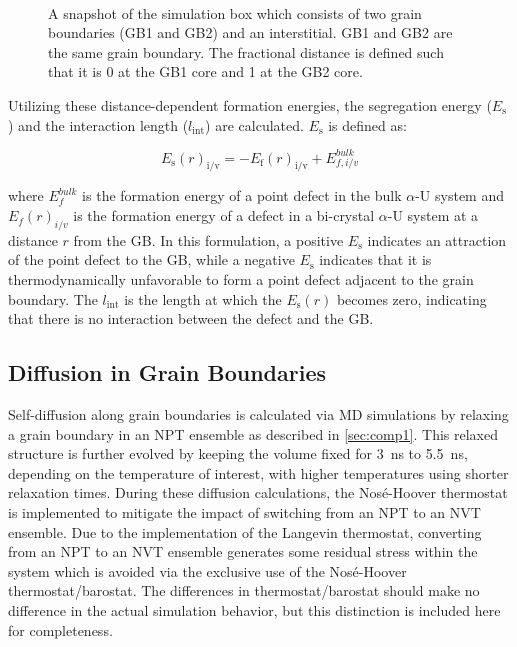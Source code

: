 \documentclass[review]{elsarticle}
\begin{document}
\begin{figure}[h!]
\centering
{}\\
\caption{A snapshot of the simulation box which consists of two grain boundaries (GB1 and GB2) and an interstitial. GB1 and GB2 are the same grain boundary. The fractional distance is defined such that it is 0 at the GB1 core and 1 at the GB2 core.}
\label{fig:GB}
\end{figure}

Utilizing these distance-dependent formation energies, the segregation energy ($E_{\mathrm{s}}$) and the interaction length ($l_{\mathrm{int}}$) are calculated. $E_{\mathrm{s}}$ is defined as:

\begin{equation}
\label{eq:eform2}
E_{\mathrm{s}}(r)_{\mathrm{i/v}} = -E_{\mathrm{f}}(r)_{\mathrm{i/v}} + E_{f,i/v}^{bulk}
\end{equation}

\noindent where $E_{f}^{bulk}$ is the formation energy of a point defect in the bulk $\alpha$-U system and $E_f(r)_{i/v}$ is the formation energy of a defect in a bi-crystal $\alpha$-U system at a distance $r$ from the GB. In this formulation, a positive $E_{\mathrm{s}}$ indicates an attraction of the point defect to the GB, while a negative $E_{\mathrm{s}}$ indicates that it is thermodynamically unfavorable to form a point defect adjacent to the grain boundary. The  $l_{\mathrm{int}}$ is the length at which the $E_{\mathrm{s}}(r)$ becomes zero, indicating that there is no interaction between the defect and the GB.  

\subsection{Diffusion in Grain Boundaries}\label{sec:comp2}
\par Self-diffusion along grain boundaries is calculated via MD simulations 
by relaxing a grain boundary in an NPT ensemble as described in \cref{sec:comp1}. This relaxed structure is further evolved by keeping the volume fixed for 3~ns to 5.5~ns, depending on the temperature of interest, with higher temperatures using shorter relaxation times. During these diffusion calculations, the Nos\'{e}-Hoover thermostat is implemented to mitigate the impact of switching from an NPT to an NVT ensemble. Due to the implementation of the Langevin thermostat, converting from an NPT to an NVT ensemble generates some residual stress within the system which is avoided via the exclusive use of the Nos\'{e}-Hoover thermostat/barostat. The differences in thermostat/barostat should make no difference in the actual simulation behavior, but this distinction is included here for completeness. 
\end{document}

